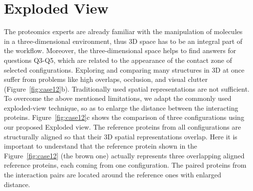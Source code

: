 \documentclass{bmcart}
\def\ExpView {Exploded view\xspace}
\def\MatView {Matrix view\xspace}
\begin{document}









\section{Exploded View}
The proteomics experts are already familiar with the manipulation of molecules in a three-dimensional environment, thus 3D space has to be an integral part of the workflow.
Moreover, the three-dimensional space helps to find answers for questions Q3-Q5, which are related to the appearance of the contact zone of selected configurations.
Exploring and comparing many structures in 3D at once suffer from problems like high overlaps, occlusion, and visual clutter (Figure~\ref{fig:case12}b). 
Traditionally used spatial representations are not sufficient.
To overcome the above mentioned limitations, we adapt the commonly used exploded-view technique, so as to enlarge the distance between the interacting proteins. 
Figure~\ref{fig:case12}c shows the comparison of three configurations using our proposed \ExpView.
The reference proteins from all configurations are structurally aligned so that their 3D spatial representations overlap. 
Here it is important to understand that the reference protein shown in the Figure~\ref{fig:case12} (the brown one) actually represents three overlapping aligned reference proteins, each coming from one configuration.
The paired proteins from the interaction pairs are located around the reference ones with enlarged distance.
\end{document}
